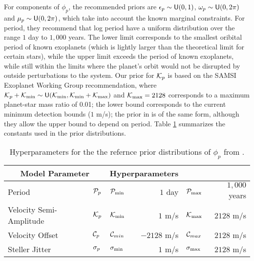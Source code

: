 For components of $\phi_p$, the recommended priors are  $\e_p \sim \U(0,1)$, $\omega_p \sim \U(0, 2
\pi)$ and $\mu_p \sim \U(0, 2 \pi)$, which take into account the known
marginal constraints.  For period, they recommend that log period have
a uniform distribution over the range $1$ day to $1,000$ years.  The
lower limit corresponds to the smallest oribital period of known
exoplanets (which is lightly larger than the theoretical limit for
certain stars), while the upper limit exceeds the period of known
exoplanets, while still within the limits where the planet's orbit would not be
disrupted by outside perturbations to the system.  Our prior for $\K_p$
is based on the SAMSI Exoplanet Working Group recommendation, where
$\K_p + \K_{\min} \sim  \U(\K_{\min}, \K_{\min} + \K_{\max})$ and 
$\K_{\max} = 2128$ corresponds to a maximum 
planet-star mass ratio of 0.01;  the lower bound corresponds to the
current minimum detection bounds ($1$ m/s); the prior in
\citet{ford2006bms} is of the same form, although they allow the upper
bound to depend on period.  Table \ref{tab:hyper} summarizes the
constants used in the prior distributions.
\begin{table}[h]
  \begin{center}
  \begin{tabular} {|ll|lr|lr|} \hline \hline
\multicolumn{2}{|c}{Model Parameter} &
\multicolumn{2}{|c|}{Hyperparameters}  \\ \hline
Period & $\P_p$ & $\P_{\min}$ &  $1$ day & $\P_{\max}$ &  $1,000$ years \\
Velocity Semi-Amplitude &$\K_p$ & $\K_{\min}$ &  $ 1$ m/s &  $\K_{\max}$ &  $2128$ m/s \\
Velocity Offset & $\C_p$ & $\C_{min}$ &  $-2128$ m/s & $\C_{max}$ &   $2128$ m/s \\
Steller Jitter & $\sj_p$  &$\sj_{\min}$ &  $1$ m/s & $\sj_{\max}$ &  $2128$ m/s \\ \hline
  \end{tabular}
  \end{center}
\caption{Hyperparameters for the the refernce prior distributions of
  $\phi_p$ from \citet{ford2006bms}.}
\label{tab:hyper}
\end{table} 




